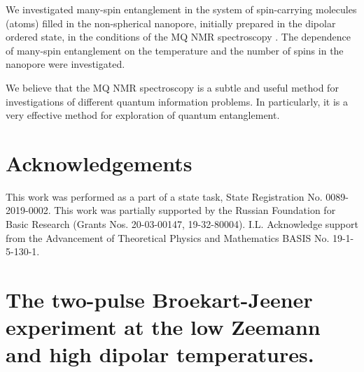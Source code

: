 \documentclass[review]{elsarticle}
\begin{document}
We investigated many-spin entanglement in the system of spin-carrying molecules (atoms) filled in the non-spherical nanopore, initially prepared in the dipolar ordered state, in the conditions of the MQ NMR spectroscopy .
The dependence of many-spin entanglement on the temperature and the number of spins in the nanopore were investigated.

We believe that the MQ NMR spectroscopy is a subtle and useful method for investigations of different quantum information problems.
In particularly, it is a very effective method for exploration of quantum entanglement.



\section{Acknowledgements}
This work was performed as a part of a state task, State Registration No. 0089-2019-0002. 
This work was partially supported by the Russian Foundation for Basic Research (Grants Nos. 20-03-00147, 19-32-80004). 
I.L. Acknowledge support from the Advancement of Theoretical Physics and Mathematics BASIS No. 19-1-5-130-1.



\appendix
\section{The two-pulse Broekart-Jeener experiment at the low Zeemann and high dipolar temperatures.}
\end{document}
